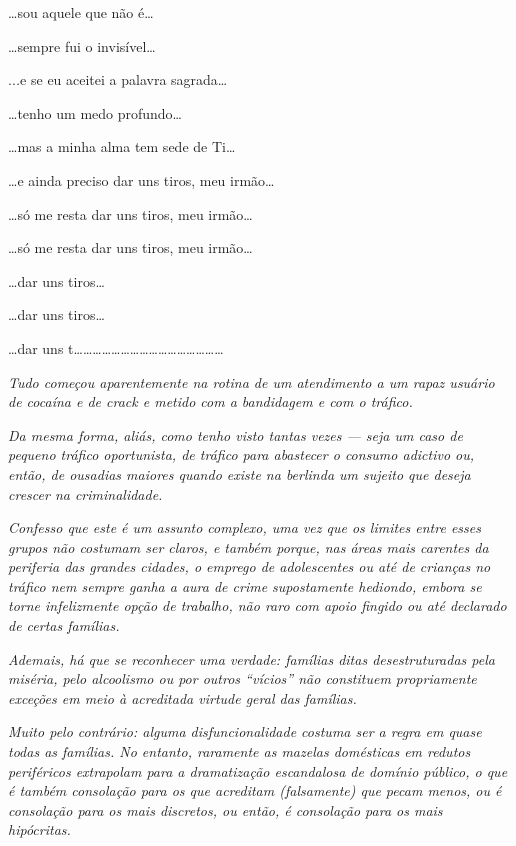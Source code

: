 …sou aquele que não é…

…sempre fui o invisível…

..\emph{.}e se eu aceitei a palavra sagrada…

…tenho um medo profundo…

…mas a minha alma tem sede de Ti…

…e ainda preciso dar uns tiros, meu irmão…

…só me resta dar uns tiros, meu irmão…

…só me resta dar uns tiros, meu irmão…

…dar uns tiros…

…dar uns tiros…

…dar uns
t…………………………………………

\begin{center}\asterisc{}\end{center}
\begingroup\small

\emph{Tudo começou aparentemente na rotina de um atendimento a um rapaz
usuário de cocaína e de crack e metido com a bandidagem e com o
tráfico.}~

\emph{Da mesma forma, aliás, como tenho visto tantas vezes --- seja um
caso de pequeno tráfico oportunista, de tráfico para abastecer o consumo
adictivo ou, então, de ousadias maiores quando existe na berlinda um
sujeito que deseja crescer na criminalidade.}~

\emph{Confesso que este é um assunto complexo, uma vez que os limites
entre esses grupos não costumam ser claros, e também porque, nas áreas
mais carentes da periferia das grandes cidades, o emprego de
adolescentes ou até de crianças no tráfico nem sempre ganha a aura de
crime supostamente hediondo, embora se torne infelizmente opção de
trabalho, não raro com apoio fingido ou até declarado de certas
famílias.}~

\emph{Ademais, há que se reconhecer uma verdade: famílias ditas
desestruturadas pela miséria, pelo alcoolismo ou por outros ``vícios''
não constituem propriamente exceções em meio à acreditada virtude geral
das famílias.}~

\emph{Muito pelo contrário: alguma disfuncionalidade costuma ser a regra
em quase todas as famílias. No entanto, raramente as mazelas domésticas
em redutos periféricos extrapolam para a dramatização escandalosa de
domínio público, o que é também consolação para os que acreditam
(falsamente) que pecam menos, ou é consolação para os mais discretos, ou
então, é consolação para os mais hipócritas.}~

